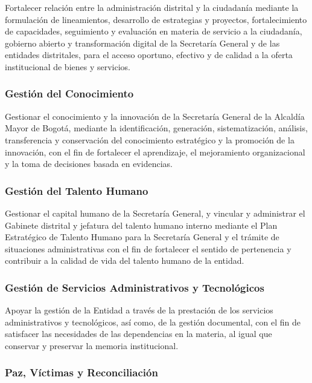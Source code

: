 \documentclass[
	a4paper, %
	12pt, %
]{include/CSSullivanBusinessReport}
\begin{document}
Fortalecer relación entre la administración distrital y la ciudadanía
mediante la formulación de lineamientos, desarrollo de estrategias y
proyectos, fortalecimiento de capacidades, seguimiento y evaluación en
materia de servicio a la ciudadanía, gobierno abierto y transformación
digital de la Secretaría General y de las entidades distritales, para el
acceso oportuno, efectivo y de calidad a la oferta institucional de
bienes y servicios.

\subsubsection{Gestión del
Conocimiento}\label{sec:gestiuxf3n-del-conocimiento}

Gestionar el conocimiento y la innovación de la Secretaría General de la
Alcaldía Mayor de Bogotá, mediante la identificación, generación,
sistematización, análisis, transferencia y conservación del conocimiento
estratégico y la promoción de la innovación, con el fin de fortalecer el
aprendizaje, el mejoramiento organizacional y la toma de decisiones
basada en evidencias.

\subsubsection{Gestión del Talento
Humano}\label{sec:gestiuxf3n-del-talento-humano}

Gestionar el capital humano de la Secretaría General, y vincular y
administrar el Gabinete distrital y jefatura del talento humano interno
mediante el Plan Estratégico de Talento Humano para la Secretaría
General y el trámite de situaciones administrativas con el fin de
fortalecer el sentido de pertenencia y contribuir a la calidad de vida
del talento humano de la entidad.

\subsubsection{Gestión de Servicios Administrativos y
Tecnológicos}\label{sec:gestiuxf3n-de-servicios-administrativos-y-tecnoluxf3gicos}

Apoyar la gestión de la Entidad a través de la prestación de los
servicios administrativos y tecnológicos, así como, de la gestión
documental, con el fin de satisfacer las necesidades de las dependencias
en la materia, al igual que conservar y preservar la memoria
institucional.

\subsubsection{Paz, Víctimas y
Reconciliación}\label{sec:paz-vuxedctimas-y-reconciliaciuxf3n}
\end{document}
